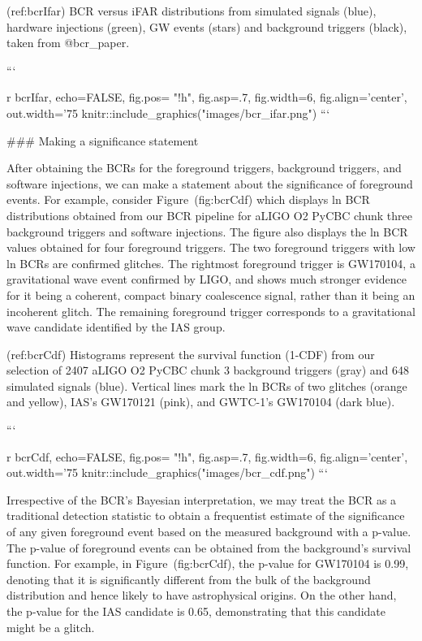 {{{{{(ref:bcrIfar) BCR versus iFAR distributions from simulated signals (blue), hardware injections (green), GW events (stars) and background triggers (black), taken from @bcr_paper.

```{r bcrIfar, echo=FALSE, fig.pos= "!h", fig.asp=.7, fig.width=6, fig.align='center', out.width='75%
knitr::include_graphics("images/bcr_ifar.png")
```



### Making a significance statement

After obtaining the BCRs for the foreground triggers, background triggers, and software injections, we can make a
statement about the significance of foreground events. For example, consider Figure~\@ref(fig:bcrCdf) which displays ln
BCR distributions obtained from our BCR pipeline for aLIGO O2 PyCBC chunk three background triggers and software injections.
The figure also displays the ln BCR values obtained for four foreground triggers. The two foreground triggers with low
ln BCRs are confirmed glitches. The rightmost foreground trigger is GW170104, a gravitational wave event confirmed by
LIGO, and shows much stronger evidence for it being a coherent, compact binary coalescence signal, rather than it being
an incoherent glitch. The remaining foreground trigger corresponds to a gravitational wave candidate identified by the
IAS group.

(ref:bcrCdf) Histograms represent the survival function (1-CDF) from our selection of 2407 aLIGO O2 PyCBC chunk 3 background triggers (gray) and 648 simulated signals (blue). Vertical lines mark the ln BCRs of two glitches (orange and yellow), IAS's GW170121 (pink), and GWTC-1's GW170104 (dark blue). 

```{r bcrCdf, echo=FALSE, fig.pos= "!h", fig.asp=.7, fig.width=6, fig.align='center', out.width='75%
knitr::include_graphics("images/bcr_cdf.png")
```

Irrespective of the BCR's Bayesian interpretation, we may treat the BCR as a traditional detection statistic to obtain a
frequentist estimate of the significance of any given foreground event based on the measured background with a p-value.
The p-value of foreground events can be obtained from the background's survival function. For example, in 
Figure~\@ref(fig:bcrCdf), the p-value for GW170104 is 0.99, denoting that it is significantly different from the bulk
of the background distribution and hence likely to have astrophysical origins. On the other hand, the p-value for the
IAS candidate is 0.65, demonstrating that this candidate might be a glitch.



}}}}}}}

